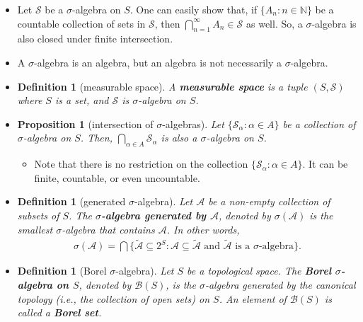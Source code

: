 \documentclass[10pt]{article}
\newtheorem{definition}[lemma]{Definition}
\newtheorem{proposition}[lemma]{Proposition}
\numberwithin{lemma}{section}
\newcommand{\mcal}[1]{\mathcal{#1}}
\newcommand{\Nat}{\mathbb{N}}
\begin{document}
\begin{itemize}
  \item Let $\mcal{S}$ be a $\sigma$-algebra on $S$. One can easily show that, if $\{A_n : n \in \Nat \}$ be a countable collection of sets in $\mcal{S}$, then $\bigcap_{n=1}^\infty A_n \in \mcal{S}$ as well. So, a $\sigma$-algebra is also closed under finite intersection.
  
  \item A $\sigma$-algebra is an algebra, but an algebra is not necessarily a $\sigma$-algebra.

  \item \begin{definition}[measurable space]
    A {\bf measurable space} is a tuple $(S,\mcal{S})$ where $S$ is a set, and $\mcal{S}$ is $\sigma$-algebra on $S$.  
  \end{definition}

  \item \begin{proposition}[intersection of $\sigma$-algebras]
    Let $\{ \mcal{S}_\alpha : \alpha \in A \}$ be a collection of $\sigma$-algebra on $S$. Then, $\bigcap_{\alpha \in A} \mcal{S}_\alpha$ is also a $\sigma$-algebra on $S$.
  \end{proposition}

  \begin{itemize}
    \item  Note that there is no restriction on the collection $\{ \mcal{S}_\alpha : \alpha \in A \}$. It can be finite, countable, or even uncountable. 
  \end{itemize}

  \item \begin{definition}[generated $\sigma$-algebra]
    Let $\mcal{A}$ be a non-empty collection of subsets of $S$. The {\bf $\sigma$-algebra generated by $\mcal{A}$}, denoted by $\sigma(\mcal{A})$ is the smallest $\sigma$-algebra that contains $\mcal{A}$. In other words,
    \begin{align*}
      \sigma(\mcal{A}) = \bigcap\Big\{\tilde{\mcal{A}} \subseteq 2^S : \mcal{A} \subseteq \tilde{\mcal{A}} \mbox{ and $\tilde{\mcal{A}}$ is a $\sigma$-algebra}\Big\}.
    \end{align*}
  \end{definition}

  \item \begin{definition}[Borel $\sigma$-algebra]
    Let $S$ be a topological space. The {\bf Borel $\sigma$-algebra on $S$}, denoted by $\mcal{B}(S)$, is the $\sigma$-algebra generated by the canonical topology (i.e., the collection of open sets) on $S$. An element of $\mcal{B}(S)$ is called a {\bf Borel set}.
  \end{definition}


\end{itemize}
\end{document}
